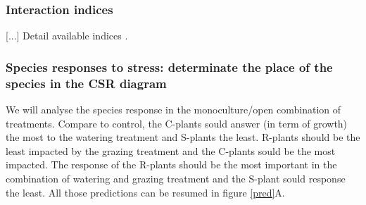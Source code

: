 \documentclass[12pt]{article} %
\begin{document}
\subsubsection{Interaction indices}
[...] Detail available indices \citep{Seifan2010}.

\subsubsection{Species responses to stress: determinate the place of the species in the CSR diagram}
We will analyse the species response in the monoculture/open combination of treatments. Compare to control, the C-plants sould answer (in term of growth) the most to the watering treatment and S-plants the least. R-plants should be the least impacted by the grazing treatment and the C-plants sould be the most impacted. The response of the R-plants should be the most important in the combination of watering and grazing treatment and the S-plant sould response the least. All those predictions can be resumed in figure \ref{pred}A.
\end{document}
